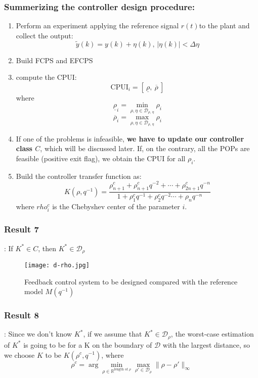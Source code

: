 \subsubsection{Summerizing the controller design procedure:}
\begin{enumerate}
    \item Perform an experiment applying the reference signal $r(t)$to the plant and collect the output:
    \[
    \tilde{y}(k) = y(k) + \eta(k),\,|\eta(k)| < \Delta\eta
    \]
    
    \item Build FCPS and EFCPS
    \item compute the CPUI:
    \[
    \text{CPUI}_i = [\:\underline{\rho},\:\overline{\rho}\:]
    \]
    where
    \[
    \underline{\rho}_i = \min\limits_{\rho,\eta \in \mathcal{D}_{\rho,\,\eta}} \rho_i
    \]
    \[
    \overline{\rho}_i = \max\limits_{\rho,\eta \in \mathcal{D}_{\rho,\,\eta}} \rho_i
    \]
    \item If one of the problems is infeasible, \textbf{we have to update our controller class $C$}, which will be discussed later.
    If, on the contrary, all the POPs are feasible (positive exit flag), we obtain the CPUI for all $\rho_i$.
    \item Build the controller transfer function as:
    \[
    K(\rho,q^{-1}) = \frac{\rho_{n+1}^c + \rho_{n+1}^cq^{-2} + \cdots + \rho_{2n+1}^cq^{-n}}{1+ \rho_1^cq^{-1} + \rho_2^cq^{-2} \cdots + \rho_{n}q^{-n}}
    \]
    where $rho_i^c$ is the Chebyshev center of the parameter $i$.
\end{enumerate}

\subsubsection{Result 7}:
If $K^{*} \in C$, then $K^{*} \in \mathcal{D}_\rho$
 \begin{figure}[H]
    \centering
    \texttt{[image: d-rho.jpg]}
    \caption{Feedback control system to be designed compared with the
 reference model $M(q^{-1})$}
 \end{figure}


\subsubsection{Result 8}:
Since we don't know $K^{*}$, if we assume that $K^{*} \in \mathcal{D}_\rho$, the worst-case estimation of $K^{*}$ is going to be for a K on the boundary of $\mathcal{D}$ with the largest distance, so we choose $K$ to be $K(\rho^c,q^{-1})$, where
\[
\rho^c = \arg \min_{\rho \in \mathbb{R}^{\text{length of $\rho$}}} \max_{\rho' \in \mathcal{D}_\rho} \|\rho - \rho'\|_\infty
\]

